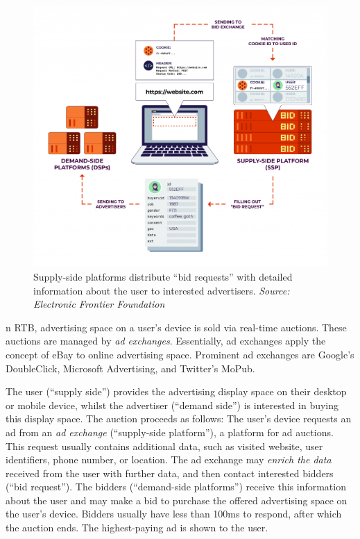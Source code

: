 \documentclass[
]{book}
\begin{document}
\begin{figure}
\centering
\includegraphics{images/real-time-bidding.png}
\caption{Supply-side platforms distribute ``bid requests'' with detailed information about the user to interested advertisers. \emph{Source: Electronic Frontier Foundation}}
\end{figure}

n RTB, advertising space on a user's device is sold via real-time auctions. These auctions are managed by \emph{ad exchanges}. Essentially, ad exchanges apply the concept of eBay to online advertising space. Prominent ad exchanges are Google's DoubleClick, Microsoft Advertising, and Twitter's MoPub.

The user (``supply side'') provides the advertising display space on their desktop or mobile device, whilst the advertiser (``demand side'') is interested in buying this display space. The auction proceeds as follows: The user's device requests an ad from an \emph{ad exchange} (``supply-side platform''), a platform for ad auctions. This request usually contains additional data, such as visited website, user identifiers, phone number, or location. The ad exchange may \emph{enrich the data} received from the user with further data, and then contact interested bidders (``bid request''). The bidders (``demand-side platforms'') receive this information about the user and may make a bid to purchase the offered advertising space on the user's device. Bidders usually have less than 100ms to respond, after which the auction ends. The highest-paying ad is shown to the user.
\end{document}
